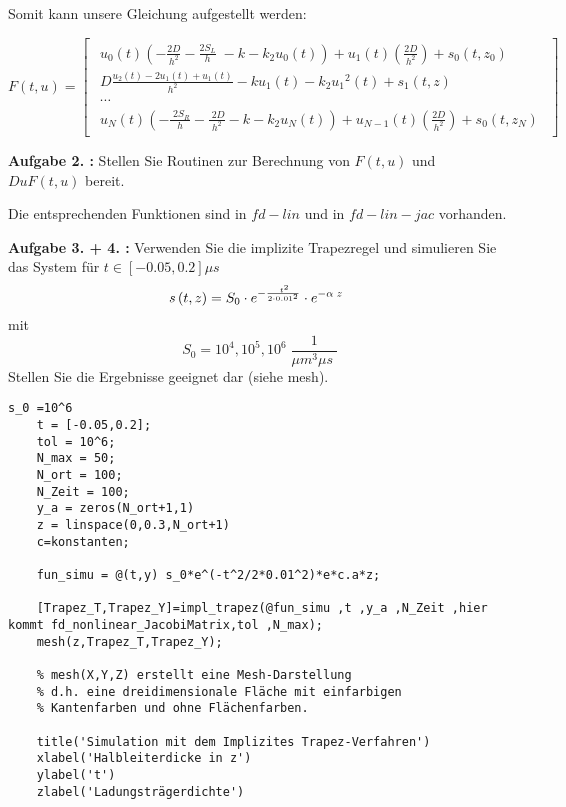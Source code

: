 Somit kann unsere Gleichung aufgestellt werden:

\begin{equation}
		F(t,u)= 
\begin{bmatrix}
	\begin{array}{c}
		u_0 \left(t\right)\left(-\frac{2D}{h^2 }-\frac{{2S}_L }{h}\;-k-k_2 u_0 \left(t\right)\right)+u_1 \left(t\right)\left(\frac{2D}{h^2 }\right)+s_0 \left(t,z_0 \right)\;\\
		D\frac{u_2 \left(t\right)-{2u}_1 \left(t\right)+u_1 \left(t\right)}{h^2 }-ku_1 \left(t\right)-k_2 {u_1 }^2 \left(t\right)+s_1 \left(t,z\right)\\
		\cdots \\
		u_N \left(t\right)\left(-\frac{\;2S_R }{h}-\frac{\;2D}{h^2 }-k-k_2 u_N \left(t\right)\right)+u_{N-1} \left(t\right)\left(\frac{2D}{h^2 }\right)+s_0 \left(t,z_N \right)
	\end{array}
\end{bmatrix}  
\end{equation}

\begin{mybox}
	\textbf{Aufgabe 2. :}	Stellen Sie Routinen zur Berechnung von $ F(t,u) $ und $ DuF(t,u) $ bereit.
\end{mybox}

Die entsprechenden Funktionen sind in $fd-lin$ und in $fd-lin-jac$ vorhanden.

\begin{mybox}
	\textbf{Aufgabe 3. + 4. :}	Verwenden Sie die implizite Trapezregel und simulieren Sie das System für $ t \in [-0.05,0.2]\mu s$ \begin{equation}s\left(t,z\right)=S_0 \cdot e^{-\frac{\;t^2 }{2\cdot 0\ldotp {01}^2 }} \cdot e^{-\alpha \;z} \;\;\end{equation} mit \begin{equation} S_0 ={10}^4 ,{10}^5 ,{10}^6 \;\frac{1}{\mu m^3 \mu s\;} \end{equation}
	Stellen Sie die Ergebnisse geeignet dar (siehe mesh).
\end{mybox}


\begin{lstlisting}[style=Matlab-editor]
	s_0 =10^6
	t = [-0.05,0.2];
	tol = 10^6;
	N_max = 50;
	N_ort = 100;
	N_Zeit = 100;
	y_a = zeros(N_ort+1,1)
	z = linspace(0,0.3,N_ort+1)
	c=konstanten;
	
	fun_simu = @(t,y) s_0*e^(-t^2/2*0.01^2)*e*c.a*z;
	
	[Trapez_T,Trapez_Y]=impl_trapez(@fun_simu ,t ,y_a ,N_Zeit ,hier kommt fd_nonlinear_JacobiMatrix,tol ,N_max);
	mesh(z,Trapez_T,Trapez_Y);
	
	% mesh(X,Y,Z) erstellt eine Mesh-Darstellung
	% d.h. eine dreidimensionale Fläche mit einfarbigen
	% Kantenfarben und ohne Flächenfarben.
	
	title('Simulation mit dem Implizites Trapez-Verfahren')
	xlabel('Halbleiterdicke in z')
	ylabel('t')
	zlabel('Ladungsträgerdichte')
\end{lstlisting}
